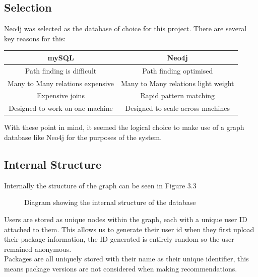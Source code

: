 \documentclass{l4proj}
\begin{document}
\subsection{Selection}
Neo4j was selected as the database of choice for this project. There are several key reasons for this:\\
\begin{center}
\begin{tabular}{|c|c|}
\hline
\textbf{mySQL} & \textbf{Neo4j}\\
\hline
Path finding is difficult & Path finding optimised\\
\hline
Many to Many relations expensive & Many to Many relations light weight\\
\hline
Expensive joins & Rapid pattern matching\\
\hline
Designed to work on one machine & Designed to scale across machines\\
\hline
\end{tabular}
\end{center}
With these point in mind, it seemed the logical choice to make use of a graph database like Neo4j for the purposes of the system.

\subsection{Internal Structure}
Internally the structure of the graph can be seen in Figure 3.3
\begin{figure}
\caption{Diagram showing the internal structure of the database}
\end{figure} 
Users are stored as unique nodes within the graph, each with a unique user ID attached to them. This allows us to generate their user id when they first upload their package information, the ID generated is entirely random so the user remained anonymous.\\
Packages are all uniquely stored with their name as their unique identifier, this means package versions are not considered when making recommendations.\\
\end{document}
